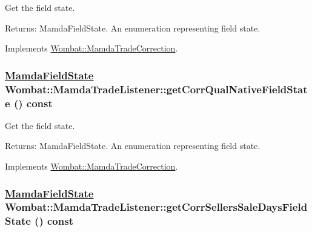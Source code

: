 Get the field state. 

\begin{Desc}
\item[Returns:]Mamda\-Field\-State. An enumeration representing field state. \end{Desc}


Implements \hyperlink{classWombat_1_1MamdaTradeCorrection_984b2d9f15a3676c9e1aa37972a6f53d}{Wombat::Mamda\-Trade\-Correction}.\hypertarget{classWombat_1_1MamdaTradeListener_4c89a664befaa59336cd1a86204dfc48}{
\subsubsection[getCorrQualNativeFieldState]{\setlength{\rightskip}{0pt plus 5cm}\hyperlink{namespaceWombat_93aac974f2ab713554fd12a1fa3b7d2a}{Mamda\-Field\-State} Wombat::Mamda\-Trade\-Listener::get\-Corr\-Qual\-Native\-Field\-State () const}}
\label{classWombat_1_1MamdaTradeListener_4c89a664befaa59336cd1a86204dfc48}


Get the field state. 

\begin{Desc}
\item[Returns:]Mamda\-Field\-State. An enumeration representing field state. \end{Desc}


Implements \hyperlink{classWombat_1_1MamdaTradeCorrection_733dac2fd8b2b932abca4dff5bad8fbc}{Wombat::Mamda\-Trade\-Correction}.\hypertarget{classWombat_1_1MamdaTradeListener_58d1851bd56ae820eff6f32eefa7509d}{
\subsubsection[getCorrSellersSaleDaysFieldState]{\setlength{\rightskip}{0pt plus 5cm}\hyperlink{namespaceWombat_93aac974f2ab713554fd12a1fa3b7d2a}{Mamda\-Field\-State} Wombat::Mamda\-Trade\-Listener::get\-Corr\-Sellers\-Sale\-Days\-Field\-State () const}}
\label{classWombat_1_1MamdaTradeListener_58d1851bd56ae820eff6f32eefa7509d}


